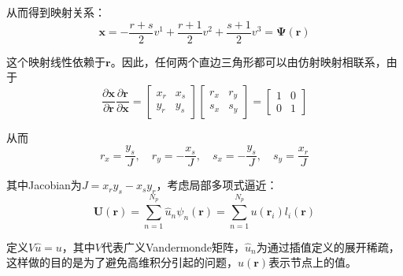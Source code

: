 \documentclass[12pt]{article}
\begin{document}
\par
从而得到映射关系：
\begin{equation}\label{2-19}
\boldsymbol{x}=-\frac{r+s}{2}v^1+\frac{r+1}{2}v^2+\frac{s+1}{2}v^3=\boldsymbol{\Psi}(\boldsymbol{r})
\end{equation}
\par
这个映射线性依赖于$\boldsymbol{r}$。因此，任何两个直边三角形都可以由仿射映射相联系，由于
\begin{equation}\label{2-20}
\frac{\partial \boldsymbol{x}}{\partial \boldsymbol{r}}\frac{\partial \boldsymbol{r}}{\partial \boldsymbol{x}}=\left [ \begin{array}{cc}x_r & x_s \\ y_r & y_s \end{array}\right ] \left [ \begin{array}{cc}r_x & r_y \\ s_x & s_y \end{array}\right ] =\left [ \begin{array}{cc}1 & 0 \\ 0 & 1 \end{array}\right ]
\end{equation}
\par
从而
\begin{equation}\label{2-21}
r_x=\frac{y_s}{J},\quad r_y=-\frac{x_s}{J},\quad s_x=-\frac{y_s}{J},\quad s_y=\frac{x_r}{J}
\end{equation}
\par
其中Jacobian为$J=x_ry_s-x_sy_r$，考虑局部多项式逼近：
\begin{equation}\label{2-22}
\boldsymbol{U(r)}=\sum_{n=1}^{N_p}\hat{u}_n \psi_n(\boldsymbol{r})=\sum_{n=1}^{N_p}u(\boldsymbol{r}_i)l_i(\boldsymbol{r})
\end{equation}
\par
定义$V\hat{u}=u$，其中$V$代表广义Vandermonde矩阵，$\hat{u}_n$为通过插值定义的展开稀疏，这样做的目的是为了避免高维积分引起的问题，$u(\boldsymbol{r})$表示节点上的值。
\end{document}
